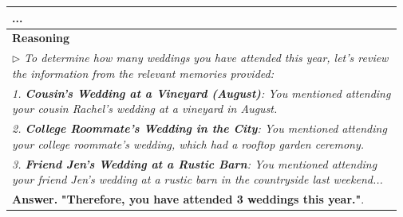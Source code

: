 \begin{table}[H]
\begin{tabularx}{\linewidth}{p{0.97\linewidth}}
...\\
\midrule
\textbf{Reasoning}\\
\midrule
\(\triangleright\) \emph{To determine how many weddings you have attended this year, let's review the information from the relevant memories provided:}\\
\emph{1. \textbf{Cousin's Wedding at a Vineyard (August)}: You mentioned attending your cousin Rachel's wedding at a vineyard in August.}\\
\emph{2. \textbf{College Roommate's Wedding in the City}: You mentioned attending your college roommate's wedding, which had a rooftop garden ceremony.}\\
\emph{3. \textbf{Friend Jen's Wedding at a Rustic Barn}: You mentioned attending your friend Jen's wedding at a rustic barn in the countryside last weekend...}\\
\midrule
\textbf{Answer.} \textbf{"Therefore, you have attended 3 weddings this year."}.\\
\bottomrule
\end{tabularx}
\end{table}